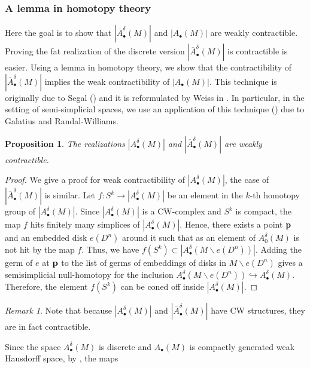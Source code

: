 \documentclass[a4paper]{amsart}
\newtheorem{prop}[thm]{Proposition}
\theoremstyle{definition}
\theoremstyle{remark}
\newtheorem{rem}[thm]{Remark}
\numberwithin{equation}{section}
\begin{document}
\subsubsection{A lemma in homotopy theory}
Here the goal is to show that $ |\overline{A}^{\delta}_{\bullet}(M)|$ and $|A_{\bullet}(M)|$ are weakly contractible. Proving the fat realization of the discrete version $ |\overline{A}^{\delta}_{\bullet}(M)|$ is contractible is easier. Using a  lemma  in homotopy theory, we show that the contractibility of $ |\overline{A}^{\delta}_{\bullet}(M)|$ implies the weak contractibility of  $|A_{\bullet}(M)|$. This technique is originally due to Segal (\cite[Appendix]{segal1978classifying}) and it is reformulated by Weiss in  \cite[Lemma 2.2]{weiss2005does}. In particular, in the setting of semi-simplicial spaces, we use an application of this technique (\cite[Proposition 2.8]{galatius2014homological}) due to Galatius and Randal-Williams.
\begin{prop}\label{claim}
The realizations $|A^{\delta}_{\bullet}(M)|$ and $ |\overline{A}^{\delta}_{\bullet}(M)|$ are weakly contractible.
\end{prop}
\begin{proof}
We give a proof for weak contractibility of $|A^{\delta}_{\bullet}(M)|$, the case of $ |\overline{A}^{\delta}_{\bullet}(M)|$ is similar. Let $ f: S^k\to |A^{\delta}_{\bullet}(M)|$ be an element in the $k$-th homotopy group of $|A^{\delta}_{\bullet}(M)|$. Since $|A^{\delta}_{\bullet}(M)|$ is a CW-complex and $S^k$ is compact, the map $f$ hits finitely many simplices of $|A^{\delta}_{\bullet}(M)|$. Hence, there exists a point   ${\bf p}$ and an embedded disk $e(D^n)$ around it such that as an element of $A^{\delta}_{0}(M)$ is not hit by the map $f$. Thus, we have $f(S^k)\subset |A^{\delta}_{\bullet}(M\backslash e(D^n))|$. Adding the germ of $e$ at ${\bf p}$ to the list of germs of embeddings of disks in $M\backslash e(D^n)$ gives a semisimplicial null-homotopy for the inclusion $A^{\delta}_{\bullet}(M\backslash e(D^n))\hookrightarrow A^{\delta}_{\bullet}(M)$. Therefore, the element $f(S^k)$ can be coned off inside $|A^{\delta}_{\bullet}(M)|$.
\end{proof}
\begin{rem}
Note that because $|A^{\delta}_{\bullet}(M)|$ and $ |\overline{A}^{\delta}_{\bullet}(M)|$ have CW structures, they are in fact contractible.
\end{rem}
Since the space $A^{\delta}_{\bullet}(M)$ is discrete and $A_{\bullet}(M)$ is compactly generated weak Hausdorff space, by \cite[Lemma 2.1]{randal2009resolutions}, the maps
\end{document}
